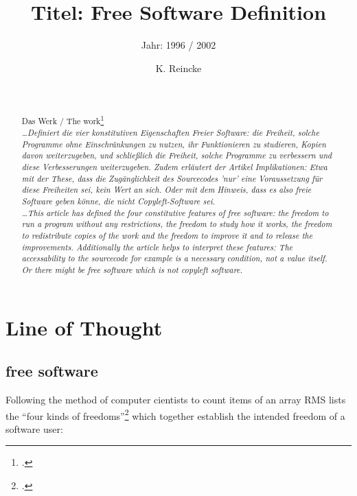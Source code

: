 \documentclass[DIV=calc,BCOR=5mm,11pt,headings=small,oneside,abstract=true, toc=bib]{scrartcl}
\begin{document}

\titlehead{Literaturexzerpt}
\subject{Autor(en): Stallman / Stallman1996a}
\title{Titel: Free Software Definition}
\subtitle{Jahr: 1996 / 2002 }
\author{K. Reincke}

\maketitle

\begin{abstract}
\noindent
\cite[(in:)][]{StaGay2002a} \\
\noindent
\cite[(ist:)][]{Stallman1996a} \\
Das Werk / The work\footcite[][]{Stallman1996a} \\
\noindent \itshape
\ldots  Definiert die vier konstitutiven Eigenschaften Freier Software: die
Freiheit, solche Programme ohne Einschränkungen zu nutzen, ihr Funktionieren zu
studieren, Kopien davon weiterzugeben, und schließlich die Freiheit, solche
Programme zu verbessern und diese Verbesserungen weiterzugeben. Zudem erläutert
der Artikel Implikationen: Etwa mit der These, dass die Zugänglichkeit des
Sourcecodes 'nur' eine Voraussetzung für diese Freiheiten sei, kein Wert an
sich. Oder mit dem Hinweis, dass es also freie Software geben könne, die nicht
Copyleft-Software sei.\\
\noindent
\ldots This article has defined the four constitutive features of free software:
the freedom to run a program without any restrictions, the freedom to study how
it works, the freedom to redistribute copies of the work and the freedom to
improve it and to release the improvements. Additionally the article helps to
interpret these features: The accessability to the sourcecode for example is a
necessary condition, not a value itself. Or there might be free software which
is not copyleft software.
\end{abstract}
\footnotesize
\normalsize

\section{Line of Thought}

\subsection{free software}
Following the method of computer cientists to count items of an array RMS lists
the \enquote{four kinds of freedoms}\footcite[cf][41]{Stallman1996a}  which
together establish the intended freedom of a software user:
\end{document}
